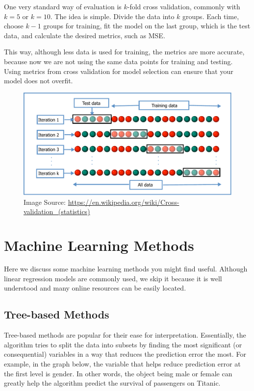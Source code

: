 \documentclass[
]{book}
\begin{document}
One very standard way of evaluation is \(k\)-fold cross validation, commonly with \(k=5\) or \(k=10\). The idea is simple. Divide the data into \(k\) groups. Each time, choose \(k-1\) groups for training, fit the model on the last group, which is the test data, and calculate the desired metrics, such as MSE.

This way, although less data is used for training, the metrics are more accurate, because now we are not using the same data points for training and testing. Using metrics from cross validation for model selection can ensure that your model does not overfit.

\begin{figure}
\centering
\includegraphics{images/K-fold_cross_validation_EN.pdf}
\caption{\label{fig:unnamed-chunk-8}Image Source: \url{https://en.wikipedia.org/wiki/Cross-validation_(statistics)}}
\end{figure}

\hypertarget{machine-learning-methods}{%
\chapter{Machine Learning Methods}\label{machine-learning-methods}}

Here we discuss some machine learning methods you might find useful. Although linear regression models are commonly used, we skip it because it is well understood and many online resources can be easily located.

\hypertarget{tree-based-methods}{%
\section{Tree-based Methods}\label{tree-based-methods}}

Tree-based methods are popular for their ease for interpretation. Essentially, the algorithm tries to split the data into subsets by finding the most significant (or consequential) variables in a way that reduces the prediction error the most. For example, in the graph below, the variable that helps reduce prediction error at the first level is gender. In other words, the object being male or female can greatly help the algorithm predict the survival of passengers on Titanic.
\end{document}
